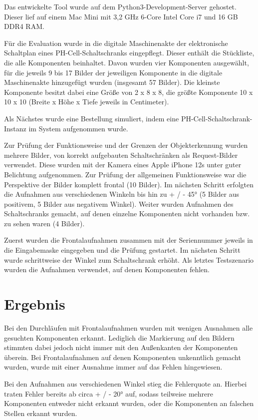 \documentclass[
    type=Prakikumsbericht,
    status=draft, %
    language=german, %
    bibengine=bibtex,
]{unibwm-inf-thesis}
\begin{document}
    Das entwickelte Tool wurde auf dem Python3-Development-Server gehostet.
    Dieser lief auf einem Mac Mini mit 3,2 GHz 6-Core Intel Core i7 und 16 GB DDR4 RAM.

    Für die Evaluation wurde in die digitale Maschinenakte der elektronische Schaltplan eines PH-Cell-Schaltschranks eingepflegt.
    Dieser enthält die Stückliste, die alle Komponenten beinhaltet.
    Davon wurden vier Komponenten ausgewählt, für die jeweils 9 bis 17 Bilder der jeweiligen Komponente in die digitale Maschinenakte hinzugefügt wurden (insgesamt 57 Bilder).
    Die kleinste Komponente besitzt dabei eine Größe von 2 x 8 x 8, die größte Komponente 10 x 10 x 10 (Breite x Höhe x Tiefe jeweils in Centimeter).

    Als Nächstes wurde eine Bestellung simuliert, indem eine PH-Cell-Schaltschrank-Instanz im System aufgenommen wurde.

    Zur Prüfung der Funktionsweise und der Grenzen der Objekterkennung wurden mehrere Bilder, von korrekt aufgebauten Schaltschränken als Request-Bilder verwendet.
    Diese wurden mit der Kamera eines Apple iPhone 12s unter guter Belichtung aufgenommen.
    Zur Prüfung der allgemeinen Funktionsweise war die Perspektive der Bilder komplett frontal (10 Bilder).
    Im nächsten Schritt erfolgten die Aufnahmen aus verschiedenen Winkeln bis hin zu + / - 45° (5 Bilder aus positivem, 5 Bilder aus negativem Winkel).
    Weiter wurden Aufnahmen des Schaltschranks gemacht, auf denen einzelne Komponenten nicht vorhanden bzw. zu sehen waren (4 Bilder).

    Zuerst wurden die Frontalaufnahmen zusammen mit der Seriennummer jeweils in die Eingabemaske eingegeben und die Prüfung gestartet.
    Im nächsten Schritt wurde schrittweise der Winkel zum Schaltschrank erhöht.
    Als letztes Testszenario wurden die Aufnahmen verwendet, auf denen Komponenten fehlen.

    \section{Ergebnis}
    Bei den Durchläufen mit Frontalaufnahmen wurden mit wenigen Ausnahmen alle gesuchten Komponenten erkannt.
    Lediglich die Markierung auf den Bildern stimmten dabei jedoch nicht immer mit den Außenkanten der Komponenten überein.
    Bei Frontalaufnahmen auf denen Komponenten unkenntlich gemacht wurden, wurde mit einer Ausnahme immer auf das Fehlen hingewiesen.

    Bei den Aufnahmen aus verschiedenen Winkel stieg die Fehlerquote an.
    Hierbei traten Fehler bereits ab circa + / - 20° auf, sodass teilweise mehrere Komponenten entweder nicht erkannt wurden, oder die Komponenten an falschen Stellen erkannt wurden.
\end{document}

